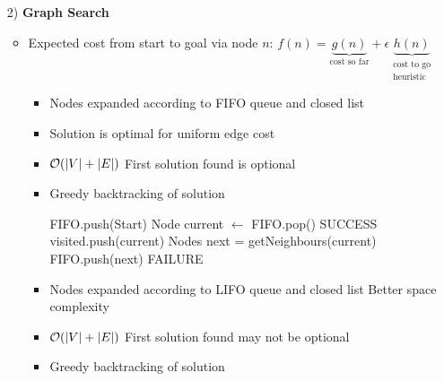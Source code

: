 \begin{itemize}
\begin{itemize}
\begin{itemize}
                \end{itemize}
        \end{itemize}
    \item[2)] \textbf{Graph Search}
        \begin{itemize}
            \item Expected cost from start to goal via node $n$: $f(n) = \underbrace{g(n)}_{\text{cost so far}} + \epsilon \underbrace{h(n)}_{\substack{\text{cost to go} \\ \text{heuristic}}}$
                \begin{itemize}
                    \item Nodes expanded according to FIFO queue and closed list
                    \item Solution is optimal for uniform edge cost
                    \item $\mathcal{O}(|V| + |E|)$
                    \ipro First solution found is optional
                    \item Greedy backtracking of solution
                        \begin{algorithmic}
                            \STATE FIFO.push(Start)
                                \STATE Node current $\leftarrow$ FIFO.pop()
                                    \RETURN SUCCESS
                                \ENDIF
                                \STATE visited.push(current)
                                \STATE Nodes next = getNeighbours(current)
                                    \STATE FIFO.push(next)
                                \ENDFOR
                            \ENDWHILE
                            \RETURN FAILURE
                        \end{algorithmic}
                \end{itemize}
                \begin{itemize}
                    \item Nodes expanded according to LIFO queue and closed list
                    \ipro Better space complexity
                    \item $\mathcal{O}(|V| + |E|)$
                    \icon First solution found may not be optional
                    \item Greedy backtracking of solution

\end{itemize}
\end{itemize}
\end{itemize}
